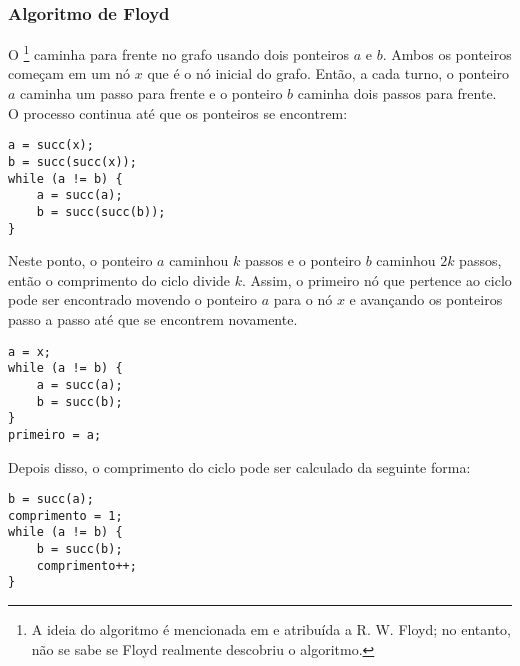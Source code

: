 \subsubsection{Algoritmo de Floyd}


O \footnote{A ideia do algoritmo é mencionada em \cite{knu982}
e atribuída a R. W. Floyd; no entanto, não se sabe se Floyd realmente
descobriu o algoritmo.} caminha para frente
no grafo usando dois ponteiros $a$ e $b$.
Ambos os ponteiros começam em um nó $x$ que
é o nó inicial do grafo.
Então, a cada turno, o ponteiro $a$ caminha
um passo para frente e o ponteiro $b$
caminha dois passos para frente.
O processo continua até
que os ponteiros se encontrem:
\begin{lstlisting}
a = succ(x);
b = succ(succ(x));
while (a != b) {
    a = succ(a);
    b = succ(succ(b));
}
\end{lstlisting}

Neste ponto, o ponteiro $a$ caminhou $k$ passos
e o ponteiro $b$ caminhou $2k$ passos,
então o comprimento do ciclo divide $k$.
Assim, o primeiro nó que pertence ao ciclo
pode ser encontrado movendo o ponteiro $a$ para o nó $x$
e avançando os ponteiros
passo a passo até que se encontrem novamente.
\begin{lstlisting}
a = x;
while (a != b) {
    a = succ(a);
    b = succ(b);
}
primeiro = a;
\end{lstlisting}

Depois disso, o comprimento do ciclo
pode ser calculado da seguinte forma:
\begin{lstlisting}
b = succ(a);
comprimento = 1;
while (a != b) {
    b = succ(b);
    comprimento++;
}
\end{lstlisting}
